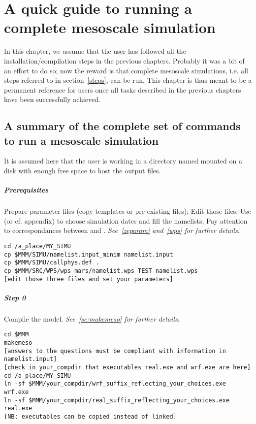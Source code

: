 \chapter{A quick guide to running a complete mesoscale simulation}\label{complete}

\vk
In this chapter, we assume that the user has followed all the installation/compilation steps in the previous chapters. Probably it was a bit of an effort to do so; now the reward is that complete mesoscale simulations, i.e. all steps referred to in section~\ref{steps}, can be run. This chapter is thus meant to be a permanent reference for users once all tasks described in the previous chapters have been successfully achieved.

\mk
\section{A summary of the complete set of commands to run a mesoscale simulation}\label{zecommands}

\sk
It is assumed here that the user is working in a directory named  mounted on a disk with enough free space to host the  output files. 

\sk
\paragraph{Prerequisites} Prepare parameter files (copy templates or pre-existing files); Edit those files; Use  (or cf. appendix) to choose simulation dates and fill the namelists; Pay attention to correspondances between  and . \emph{See~\ref{zeparam} and~\ref{wps} for further details}.
\begin{verbatim}
cd /a_place/MY_SIMU
cp $MMM/SIMU/namelist.input_minim namelist.input  
cp $MMM/SIMU/callphys.def .
cp $MMM/SRC/WPS/wps_mars/namelist.wps_TEST namelist.wps
[edit those three files and set your parameters]
\end{verbatim}

\sk
\paragraph{Step 0} Compile the model. \emph{See~\ref{sc:makemeso} for further details}.
\begin{verbatim}
cd $MMM
makemeso
[answers to the questions must be compliant with information in namelist.input]
[check in your_compdir that executables real.exe and wrf.exe are here]
cd /a_place/MY_SIMU
ln -sf $MMM/your_compdir/wrf_suffix_reflecting_your_choices.exe wrf.exe
ln -sf $MMM/your_compdir/real_suffix_reflecting_your_choices.exe real.exe
[NB: executables can be copied instead of linked]
\end{verbatim}

